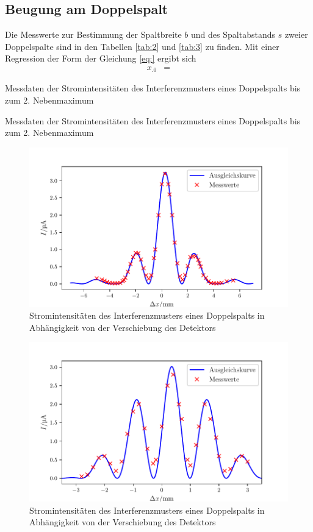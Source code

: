 \subsection{Beugung am Doppelspalt}
Die Messwerte zur Bestimmung der Spaltbreite $b$ und des Spaltabstands $s$ zweier Doppelspalte sind in den Tabellen \ref{tab:2} und \ref{tab:3} zu finden.
Mit einer Regression der Form der Gleichung \eqref{eq:} ergibt sich
\begin{align*}
x_.0 &= 
\end{align*}
\begin{table}
	\centering
	\caption{Messdaten der Stromintensitäten des Interferenzmusters eines Doppelspalts bis zum 2. Nebenmaximum}
	
	
	\label{tab:2}
\end{table}

\begin{table}
	\centering
	\caption{Messdaten der Stromintensitäten des Interferenzmusters eines Doppelspalts bis zum 2. Nebenmaximum}
	
	\label{tab:3}
\end{table}


\begin{figure}
\centering
\includegraphics[width=\linewidth-70pt,height=\textheight-70pt,keepaspectratio]{content/images/Doppelspalt1.pdf}
\caption{Stromintensitäten des Interferenzmusters eines Doppelspalts in Abhängigkeit von der Verschiebung des Detektors}
\label{fig:Doppel1}
\end{figure}

\begin{figure}
\centering
\includegraphics[width=\linewidth-70pt,height=\textheight-70pt,keepaspectratio]{content/images/Doppelspalt2.pdf}
\caption{Stromintensitäten des Interferenzmusters eines Doppelspalts in Abhängigkeit von der Verschiebung des Detektors}
\label{fig:Doppel2}
\end{figure}